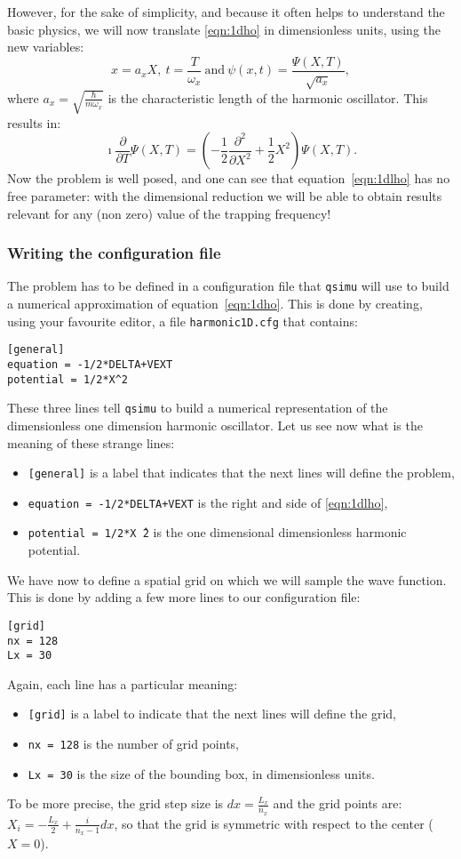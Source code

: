 \documentclass[12pt,a4paper]{report}
\newcommand{\qsimu}{\texttt{qsimu}{} }
\begin{document}
However, for the sake of simplicity, and because it often helps to understand the basic physics, we will now translate \eqref{eqn:1dho} in dimensionless units, using the new variables:
\begin{equation*}
x=a_xX,~t=\frac{T}{\omega_x}~\textrm{and}~\psi(x,t)=\frac{\Psi(X,T)}{\sqrt{a_x}},
\end{equation*}
where $a_x=\sqrt{\frac{\hbar}{m\omega_x}}$ is the characteristic length of the harmonic oscillator.
This results in:
\begin{equation}
\imath\frac{\partial}{\partial T}\Psi(X,T)=\left(-\frac{1}{2}\frac{\partial^2}{\partial X^2}+\frac{1}{2}X^2\right)\Psi(X,T).
\label{eqn:1dlho}
\end{equation}
Now the problem is well posed, and one can see that equation~\eqref{eqn:1dlho} has no free parameter: with the dimensional reduction we will be able to obtain results relevant for any (non zero) value of the trapping frequency!

\subsubsection{Writing the configuration file}
The problem has to be defined in a configuration file that \qsimu will use to build a numerical approximation of equation~\eqref{eqn:1dho}.
This is done by creating, using your favourite editor, a file \texttt{harmonic1D.cfg} that contains:
\begin{verbatim}
[general]
equation = -1/2*DELTA+VEXT
potential = 1/2*X^2
\end{verbatim}
These three lines tell \qsimu to build a numerical representation of the dimensionless one dimension harmonic oscillator.
Let us see now what is the meaning of these strange lines:
\begin{itemize}
\item\texttt{[general]} is a label that indicates that the next lines will define the problem,
\item\texttt{equation = -1/2*DELTA+VEXT} is the right and side of \eqref{eqn:1dlho},
\item\texttt{potential = 1/2*X\^\,2} is the one dimensional dimensionless harmonic potential.
\end{itemize}

We have now to define a spatial grid on which we will sample the wave function.
This is done by adding a few more lines to our configuration file:
\begin{verbatim}
[grid]
nx = 128
Lx = 30
\end{verbatim}
Again, each line has a particular meaning:
\begin{itemize}
\item \texttt{[grid]} is a label to indicate that the next lines will define the grid,
\item \texttt{nx = 128} is the number of grid points,
\item \texttt{Lx = 30} is the size of the bounding box, in dimensionless units.
\end{itemize}
To be more precise, the grid step size is $dx=\frac{L_x}{n_x}$ and the grid points are: $X_i=-\frac{L_x}{2}+\frac{i}{n_x-1}dx$, so that the grid is symmetric with respect to the center ($X=0$).
\end{document}
